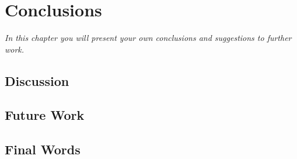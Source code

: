 \chapter{Conclusions}

\emph{In this chapter you will present your own conclusions and suggestions to further work.}

\lipsum[60]

\section{Discussion}

\lipsum[61-63]

\section{Future Work}

\lipsum[64-65]

\section{Final Words}

\lipsum[66]
